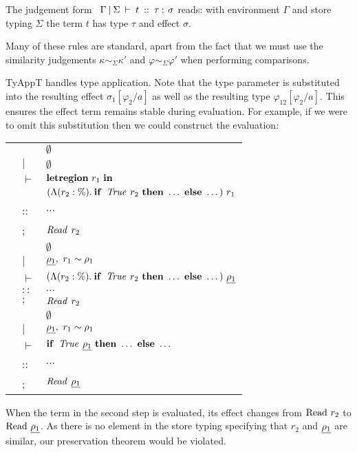 \bigskip
The judgement form \ $\Gamma \: \arrowvert \: \Sigma \: \vdash \: t \: :: \: \tau \: ; \: \sigma$ reads: with environment $\Gamma$ and store typing $\Sigma$ the term $t$ has type $\tau$ and effect $\sigma$.

Many of these rules are standard, apart from the fact that we must use the similarity judgements $\kappa \sim_{\Sigma} \kappa'$ and $\varphi \sim_{\Sigma} \varphi'$ when performing comparisons. 

TyAppT handles type application. Note that the type parameter is substituted into the resulting effect $\sigma_1[\varphi_2/a]$ as well as the resulting type $\varphi_{12}[\varphi_2/a]$. This ensures the effect term remains stable during evaluation. For example, if we were to omit this substitution then we could construct the evaluation:

\bigskip
\qq
\begin{tabular}{lll}
	&		& $\emptyset$ \\
 	& $|$		& $\emptyset$ \\
	& $\vdash$ 	& $\textrm{\textbf{letregion}} \ r_1 \ \textrm{\textbf{in}}$ \\
	&		& $(\Lambda(r_2 : \%). \: \textrm{\textbf{if}} \ \operatorname{\mathit{True}} \: r_2 \ \textrm{\textbf{then}} \ \dots \ \textrm{\textbf{else}} \ \dots) \ r_1$ \\
	& ::		& $\dots$ \\
	& ; 		& $\operatorname{\mathit{Read}} \: r_2$ 
\\[2em]
\eto	& 		& $\emptyset$ \\
	& $|$		& $\underline{\rho_1}, \ r_1 \sim \rho_1$ \\
	& $\vdash$	& $(\Lambda(r_2 : \%). \: \textrm{\textbf{if}} \ \operatorname{\mathit{True}} \: r_2 \ \textrm{\textbf{then}} \ \dots \ \textrm{\textbf{else}} \ \dots) \ \underline{\rho_1}$ \\
	& $::$		& $\dots$ \\
	& $;$		& $\operatorname{\mathit{Read}} \: r_2$
\\[2em]
\eto	& 		& $\emptyset$ \\
	& $|$		& $\underline{\rho_1}, \ r_1 \sim \rho_1$ \\
	& $\vdash$	& $\textrm{\textbf{if}} \ \operatorname{\mathit{True}} \: \underline{\rho_1} \ \textrm{\textbf{then}} \ \dots \ \textrm{\textbf{else}} \ \dots$ \\
	& ::		& $\dots$ \\
	& ;		& $\operatorname{\mathit{Read}} \: \underline{\rho_1}$ 
\end{tabular}

\bigskip

When the term in the second step is evaluated, its effect changes from $\textrm{Read} \ r_2$ to $\textrm{Read} \ \underline{\rho_1}$. As there is no element in the store typing specifying that $r_2$ and $\underline{\rho_1}$ are similar, our preservation theorem would be violated.

